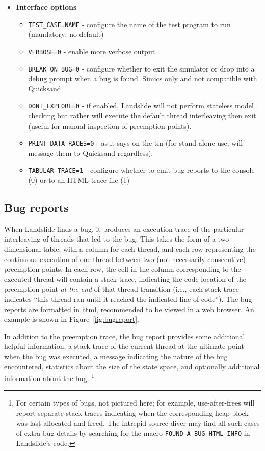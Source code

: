 \begin{itemize}
\item {\bf Interface options}
\begin{itemize}
	\item {\tt TEST\_CASE=NAME} - configure the name of the test program to run (mandatory; no default)
	\item {\tt VERBOSE=0} - enable more verbose output
	\item {\tt BREAK\_ON\_BUG=0} - configure whether to exit the simulator or drop into a debug prompt when a bug is found. Simics only and not compatible with Quicksand.
	\item {\tt DONT\_EXPLORE=0} - if enabled, Landslide will not perform stateless model checking but rather will execute the default thread interleaving then exit (useful for manual inspection of preemption points).
	\item {\tt PRINT\_DATA\_RACES=0} - as it says on the tin (for stand-alone use; will message them to Quicksand regardless).
	\item {\tt TABULAR\_TRACE=1} - configure whether to emit bug reports to the console (0) or to an HTML trace file (1)
\end{itemize}
\end{itemize}


\subsection{Bug reports}
\label{sec:landslide-bugreport}

When Landslide finds a bug, it produces an execution trace of the particular interleaving of threads that led to the bug.
This takes the form of a two-dimensional table,
with a column for each thread,
and each row representing the continuous execution of one thread between two (not necessarily consecutive) preemption points.
In each row, the cell in the column corresponding to the executed thread will contain a stack trace,
indicating the code location of the preemption point {\em at the end} of that thread transition
(i.e., each stack trace indicates ``this thread ran until it reached the indicated line of code'').
The bug reports are formatted in html, recommended to be viewed in a web browser.
An example is shown in Figure~\ref{fig:bugreport}.

In addition to the preemption trace, the bug report provides some additional helpful information:
a stack trace of the current thread at the ultimate point when the bug was executed,
a message indicating the nature of the bug encountered,
statistics about the size of the state space,
and optionally additional information about the bug.%
\footnote{For certain types of bugs, not pictured here;
for example, use-after-frees will report separate stack traces
indicating when the corresponding heap block was last allocated and freed.
The intrepid source-diver may find all such cases of extra bug details
by searching for the macro {\tt FOUND\_A\_BUG\_HTML\_INFO} in Landslide's code.}


